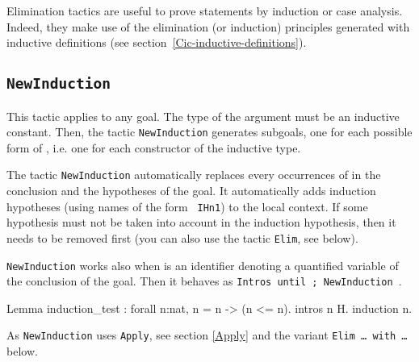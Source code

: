 Elimination tactics are useful to prove statements by induction or
case analysis.  Indeed, they make use of the elimination (or
induction) principles generated with inductive definitions (see
section~\ref{Cic-inductive-definitions}).

\subsection{\tt NewInduction \term}

This tactic applies to any goal. The type of the argument {\term} must
be an inductive constant. Then, the tactic {\tt NewInduction}
generates subgoals, one for each possible form of {\term}, i.e. one
for each constructor of the inductive type.

The tactic {\tt NewInduction} automatically replaces every occurrences
of {\term} in the conclusion and the hypotheses of the goal.  It
automatically adds induction hypotheses (using names of the form {\tt
  IHn1}) to the local context. If some hypothesis must not be taken
into account in the induction hypothesis, then it needs to be removed
first (you can also use the tactic {\tt Elim}, see below).

{\tt NewInduction} works also when {\term} is an identifier denoting a
  quantified variable of the conclusion of the goal. Then it behaves as
  {\tt Intros until {\ident}; NewInduction {\ident}}.

\begin{coq_example}
Lemma induction_test : forall n:nat, n = n -> (n <= n).
intros n H.
induction n.
\end{coq_example}

\begin{ErrMsgs}
\item {}
\item {}
  
  As {\tt NewInduction} uses {\tt Apply}, see section \ref{Apply} and
  the variant {\tt Elim \dots\ with \dots} below.
\end{ErrMsgs}


